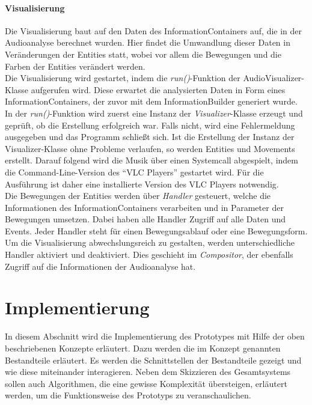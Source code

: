 \documentclass[11pt,a4paper]{article}
\begin{document}
\paragraph{Visualisierung}
Die Visualisierung baut auf den Daten des InformationContainers auf, die in der Audioanalyse berechnet wurden. Hier findet die Umwandlung dieser Daten in Veränderungen der Entities statt, wobei vor allem die Bewegungen und die Farben der Entities verändert werden.\\
Die Visualisierung wird gestartet, indem die \textit{run()}-Funktion der AudioVisualizer-Klasse aufgerufen wird. Diese erwartet die analysierten Daten in Form eines InformationContainers, der zuvor mit dem InformationBuilder generiert wurde. In der \textit{run()}-Funktion wird zuerst eine Instanz der \textit{Visualizer}-Klasse erzeugt und geprüft, ob die Erstellung erfolgreich war. Falls nicht, wird eine Fehlermeldung ausgegeben und das Programm schließt sich. Ist die Erstellung der Instanz der Visualizer-Klasse ohne Probleme verlaufen, so werden Entities und Movements erstellt. Darauf folgend wird die Musik über einen Systemcall abgespielt, indem die Command-Line-Version des ``VLC Players'' gestartet wird. Für die Ausführung ist daher eine installierte Version des VLC Players notwendig.\\
Die Bewegungen der Entities werden über \textit{Handler} gesteuert, welche die Informationen des InformationContainers verarbeiten und in Parameter der Bewegungen umsetzen. Dabei haben alle Handler Zugriff auf alle Daten und Events. Jeder Handler steht für einen Bewegungsablauf oder eine Bewegungsform. Um die Visualisierung abwechslungsreich zu gestalten, werden unterschiedliche Handler aktiviert und deaktiviert. Dies geschieht im \textit{Compositor}, der ebenfalls Zugriff auf die Informationen der Audioanalyse hat.

\newpage
\section{Implementierung}
In diesem Abschnitt wird die Implementierung des Prototypes mit Hilfe der oben beschriebenen Konzepte erläutert. Dazu werden die im Konzept genannten Bestandteile erläutert. Es werden die Schnittstellen der Bestandteile gezeigt und wie diese miteinander interagieren. Neben dem Skizzieren des Gesamtsystems sollen auch Algorithmen, die eine gewisse Komplexität übersteigen, erläutert werden, um die Funktionsweise des Prototyps zu veranschaulichen.
\end{document}
